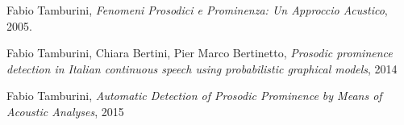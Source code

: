 \documentclass[twoside,twocolumn,11pt]{extarticle}
\theoremstyle{definition}
\begin{document}
\begin{thebibliography}{99}	
		Fabio Tamburini,
		\newblock \emph{Fenomeni Prosodici e Prominenza: Un Approccio Acustico},
		2005.
	
		Fabio Tamburini, Chiara Bertini, Pier Marco Bertinetto,
		\newblock \emph{Prosodic prominence detection in Italian continuous speech using probabilistic graphical models},
		2014
		
		Fabio Tamburini,
		\newblock \emph{Automatic Detection of Prosodic Prominence by Means of Acoustic Analyses},
		2015
\end{thebibliography}
\end{document}
